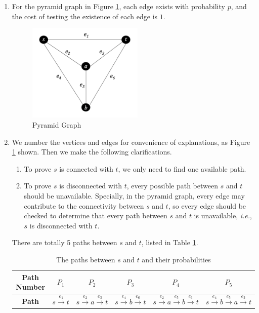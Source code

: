 \documentclass{oxmathproblems}
\makeatletter
\theoremstyle{definition}
\renewenvironment{solution}[1][Solution] {\par\pushQED{\qed}\normalfont\topsep6\p@\@plus6\p@\relax\trivlist\item[\hskip\labelsep\bfseries#1\@addpunct{.}]\ignorespaces}{\popQED\endtrivlist\@endpefalse} \makeatother
\makeatother
\begin{document}
\begin{enumerate}
\item For the pyramid graph in Figure \ref{fig1}, each edge exists with probability $p$, and the cost of testing the existence of each edge is $1$. 
\begin{figure}[htbp]
\label{fig1}
\centering
\includegraphics[width=5.5cm]{1.png}
\caption{Pyramid Graph}
\end{figure}
\begin{solution}
	We number the vertices and edges for convenience of explanations, as Figure \ref{fig1} shown. Then we make the following clarifications.
	\vspace{-0.2cm}
	\begin{enumerate}
		\item To prove $s$ is connected with $t$, we only need to find one available path.
		\item To prove $s$ is disconnected with $t$, every possible path between $s$ and $t$ should be unavailable. Specially, in the pyramid graph, every edge may contribute to the connectivity between $s$ and $t$, so every edge should be checked to determine that every path between $s$ and $t$ is unavailable, \textit{i.e.}, $s$ is disconnected with $t$.
	\end{enumerate}
	\vspace{-0.2cm}

	There are totally 5 paths between $s$ and $t$, listed in Table \ref{tab1}.
	
	\vspace{-0.1cm}
	\begin{table}[htbp]\label{tab1}
		\centering
		\caption{The paths between $s$ and $t$ and their probabilities}
		\begin{tabular}{|c|c|c|c|c|c|}
			\hline
			\textbf{Path Number} & $P_1$ & $P_2$ & $P_3$ & $P_4$ & $P_5$ \\ \hline 
			\textbf{Path} & $s\stackrel{e_1}{\rightarrow}t$ & $s\stackrel{e_2}{\rightarrow}a\stackrel{e_3}{\rightarrow}t$ & $s\stackrel{e_4}{\rightarrow}b\stackrel{e_6}{\rightarrow}t$ & $s\stackrel{e_2}{\rightarrow}a\stackrel{e_5}{\rightarrow}b\stackrel{e_6}{\rightarrow}t$ & $s\stackrel{e_4}{\rightarrow}b\stackrel{e_5}{\rightarrow}a\stackrel{e_3}{\rightarrow}t$ \\ \hline
		\end{tabular}
	\end{table}


\end{solution}
\end{enumerate}
\end{document}
